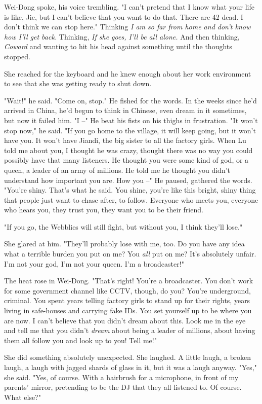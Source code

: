 Wei-Dong spoke, his voice trembling. "I can't pretend that I know
what your life is like, Jie, but I can't believe that you want to
do that. There are 42 dead. I don't think we can stop here."
Thinking
\emph{I am so far from home and don't know how I'll get back.}
Thinking, \emph{If she goes, I'll be all alone.} And then thinking,
\emph{Coward} and wanting to hit his head against something until
the thoughts stopped.

She reached for the keyboard and he knew enough about her work
environment to see that she was getting ready to shut down.

"Wait!" he said. "Come on, stop." He fished for the words. In the
weeks since he'd arrived in China, he'd begun to think in Chinese,
even dream in it sometimes, but now it failed him. "I --" He beat
his fists on his thighs in frustration. "It won't stop now," he
said. "If you go home to the village, it will keep going, but it
won't have you. It won't have Jiandi, the big sister to all the
factory girls. When Lu told me about you, I thought he was crazy,
thought there was no way you could possibly have that many
listeners. He thought you were some kind of god, or a queen, a
leader of an army of millions. He told me he thought you didn't
understand how important you are. How you --" He paused, gathered
the words. "You're shiny. That's what he said. You shine, you're
like this bright, shiny thing that people just want to chase after,
to follow. Everyone who meets you, everyone who hears you, they
trust you, they want you to be their friend.

"If you go, the Webblies will still fight, but without you, I think
they'll lose."

She glared at him. "They'll probably lose with me, too. Do you have
any idea what a terrible burden you put on me? You \emph{all} put
on me? It's absolutely unfair. I'm not your god, I'm not your
queen. I'm a broadcaster!"

The heat rose in Wei-Dong. "That's right! You're a broadcaster. You
don't work for some government channel like CCTV, though, do you?
You're underground, criminal. You spent years telling factory girls
to stand up for their rights, years living in safe-houses and
carrying fake IDs. You set yourself up to be where you are now. I
can't believe that you didn't dream about this. Look me in the eye
and tell me that you didn't \emph{dream} about being a leader of
millions, about having them all follow you and look up to you! Tell
me!"

She did something absolutely unexpected. She laughed. A little
laugh, a broken laugh, a laugh with jagged shards of glass in it,
but it was a laugh anyway. "Yes," she said. "Yes, of course. With a
hairbrush for a microphone, in front of my parents' mirror,
pretending to be the DJ that they all listened to. Of course. What
else?"

